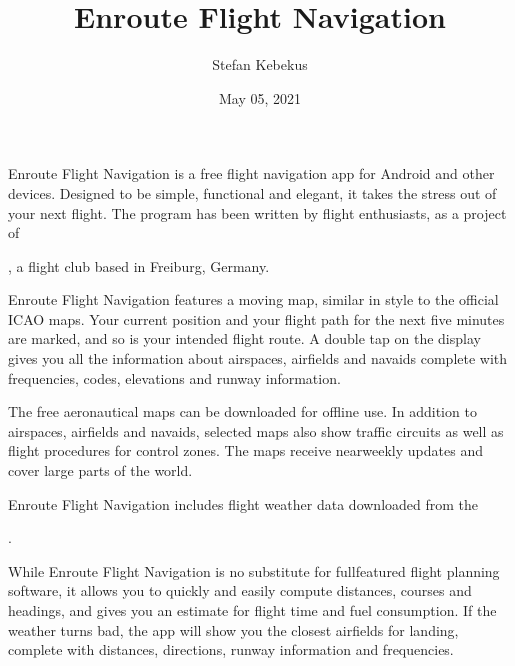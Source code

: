 \documentclass[letterpaper,10pt,english]{sphinxmanual}
\title{Enroute Flight Navigation}
\date{May 05, 2021}
\author{Stefan Kebekus}
\let\sphinxpxdimen\pdfpxdimen\else\newdimen\sphinxpxdimen
\begin{document}
\pagestyle{empty}
\sphinxmaketitle
\pagestyle{plain}
\sphinxtableofcontents
\pagestyle{normal}
\label{\detokenize{index::doc}}


\noindent{\hspace*{\fill}\sphinxincludegraphics[width=100\sphinxpxdimen]{{de.akaflieg_freiburg.enroute}.png}\hspace*{\fill}}

\sphinxAtStartPar
Enroute Flight Navigation is a free flight navigation app for Android and other
devices. Designed to be simple, functional and elegant, it takes the stress out
of your next flight. The program has been written by flight enthusiasts, as a
project of %
\begin{footnote}[1]\sphinxAtStartFootnote
{}
%
\end{footnote}, a flight club
based in Freiburg, Germany.

\sphinxAtStartPar
Enroute Flight Navigation features a moving map, similar in style to the
official ICAO maps. Your current position and your flight path for the next five
minutes are marked, and so is your intended flight route. A double tap on the
display gives you all the information about airspaces, airfields and navaids \textendash{}
complete with frequencies, codes, elevations and runway information.

\sphinxAtStartPar
The free aeronautical maps can be downloaded for offline use. In addition to
airspaces, airfields and navaids, selected maps also show traffic circuits as
well as flight procedures for control zones. The maps receive near\sphinxhyphen{}weekly
updates and cover large parts of the world.

\sphinxAtStartPar
Enroute Flight Navigation includes flight weather data downloaded from the
%
\begin{footnote}[2]\sphinxAtStartFootnote
{}
%
\end{footnote}.

\sphinxAtStartPar
While Enroute Flight Navigation is no substitute for full\sphinxhyphen{}featured flight
planning software, it allows you to quickly and easily compute distances,
courses and headings, and gives you an estimate for flight time and fuel
consumption. If the weather turns bad, the app will show you the closest
airfields for landing, complete with distances, directions, runway information
and frequencies.
\end{document}

